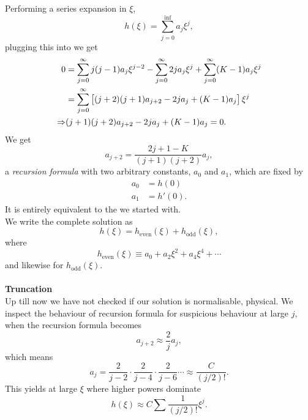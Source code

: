 Performing a series expansion in $\xi$, 
\begin{equation}
h(\xi)=\sum_{j=0}^{\inf}a_j\xi^j,
\end{equation}
plugging this into  we get
\begin{subequations}
\begin{align}
0&=\sum_{j=0}^{\infty}j(j-1)a_j\xi^{j-2}-\sum^{\infty}_{j=0}2ja_j\xi^j+\sum^{\infty}_{j=0}(K-1)a_j\xi^j\\
&=\sum_{j=0}^{\infty}\left[(j+2)(j+1)a_{j+2}-2ja_j+(K-1)a_j \right]\xi^j \\
\Rightarrow&(j+1)(j+2)a_{j+2}-2ja_j+(K-1)a_j=0.
\end{align}
\end{subequations}
We get 
\begin{equation}
\label{harm_rec}
a_{j+2}=\frac{2j+1-K}{(j+1)(j+2)}a_j, 
\end{equation}
a \textit{recursion formula} with two arbitrary constants, $a_0$ and $a_1$, which are fixed by 
\begin{subequations}
\begin{align}
a_0&=h(0)\\
a_1&=h'(0).
\end{align}
\end{subequations} 
It is entirely equivalent to the \sch we started with. \\
We write the complete solution as 
\begin{equation}
h(\xi)=h_{\text{even}}(\xi)+h_{\text{odd}}(\xi),
\end{equation}
where 
\begin{equation}
h_{\text{even}}(\xi)\equiv a_0+a_2\xi^2+a_4\xi^4+\cdots
\end{equation}
and likewise for $h_{\text{odd}}(\xi)$. \\
\ \\
\textbf{Truncation}\\
Up till now we have not checked if our solution is normalisable, \ie physical. 
We inspect the behaviour of recursion formula for suspicious behaviour at large $j$, when the recursion formula becomes
\begin{equation}
a_{j+2}\approx\frac{2}{j}a_j, 
\end{equation}
which means 
\begin{equation}
a_j=\frac{2}{j-2}\cdot\frac{2}{j-4}\cdot\frac{2}{j-6}\cdots\approx\frac{C}{(j/2)!}.
\end{equation}
This yields at large $\xi$ where higher powers dominate
\begin{equation}
h(\xi)\approx C\sum \frac{1}{(j/2)!}\xi^j. 
\end{equation}
